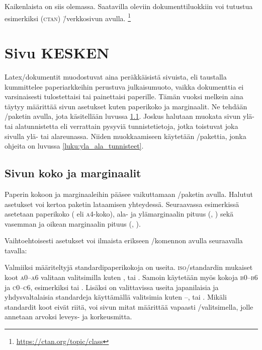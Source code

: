 Kaikenlaista on siis olemassa. Saatavilla oleviin dokumenttiluokkiin voi
tutustua esimerkiksi 
(\textsc{ctan}) \=/verkkosivun avulla.%
\footnote{\url{https://ctan.org/topic/class}}

\section{Sivu KESKEN}
\label{luku:sivuasetukset}

Latex\-/dokumentit muodostuvat aina peräkkäisistä sivuista, eli
taustalla kummittelee paperi\-arkkeihin perustuva julkaisumuoto, vaikka
dokumenttia ei varsinaisesti tulostettaisi tai painettaisi paperille.
Tämän vuoksi melkein aina täytyy määrittää sivun asetukset kuten
paperikoko ja marginaalit. Ne tehdään \-/paketin
avulla, jota käsitellään luvussa \ref{luku:sivun_mitat}. Joskus
halutaan muokata sivun ylä- tai alatunnistetta eli verrattain pysyviä
tunnistetietoja, jotka toistuvat joka sivulla ylä- tai alareunassa.
Niiden muokkaamiseen käytetään \-/pakettia, jonka
ohjeita on luvussa \ref{luku:yla_ala_tunnisteet}.

\subsection{Sivun koko ja marginaalit}
\label{luku:sivun_mitat}

Paperin kokoon ja marginaaleihin pääsee vaikuttamaan
\-/paketin avulla. Halutut asetukset
voi kertoa paketin lataamisen yhteydessä. Seuraavassa esimerkissä
asetetaan paperikoko ( eli \textsc{a4}-koko), ala- ja
ylämarginaalin pituus (, ) sekä vasemman ja
oikean marginaalin pituus (, ).

\begin{koodilohkosis}
  \usepackage[a4paper, top=20mm, bottom=30mm,
    left=20mm, right=20mm]{geometry}
\end{koodilohkosis}

Vaihtoehtoisesti asetukset voi ilmaista erikseen \-/komennon avulla seuraavalla tavalla:

\begin{koodilohkosis}
  \usepackage{geometry}
  \geometry{a4paper, top=20mm, bottom=30mm, left=20mm, right=20mm}
\end{koodilohkosis}

Valmiiksi%
 määriteltyjä standardipaperikokoja on
useita. \textsc{iso}\-/standardin mukaiset koot \textsc{a0}--\textsc{a6}
valitaan valitsimilla kuten ,  tai
. Samoin käytetään myös kokoja \textsc{b0}--\textsc{b6}
ja \textsc{c0}--\textsc{c6}, esimerkiksi  tai
. Lisäksi on valittavissa useita japanilaisia ja
yhdysvaltalaisia standardeja käyttämällä valitsimia kuten
--,  tai
. Mikäli standardit koot eivät riitä, voi sivun
mitat määrittää vapaasti \-/valitsimella, jolle
annetaan arvoksi leveys- ja korkeusmitta.

